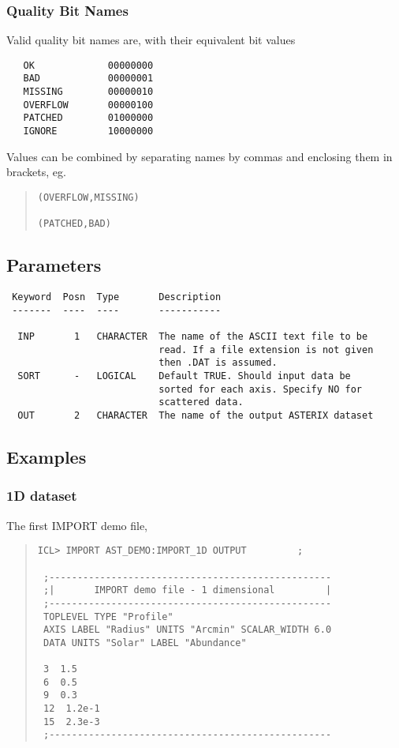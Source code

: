 \documentclass{book}
\renewcommand{\_}{{\tt\char'137}}     %
\begin{document}
\subsubsection{Quality Bit Names}
Valid quality bit names are, with their equivalent bit values
\begin{verbatim}
   OK             00000000
   BAD            00000001
   MISSING        00000010
   OVERFLOW       00000100
   PATCHED        01000000
   IGNORE         10000000
\end{verbatim}
Values can be combined by separating names by commas and enclosing
them in brackets, eg.
\begin{quote}\begin{verbatim}
(OVERFLOW,MISSING)

(PATCHED,BAD)
\end{verbatim}\end{quote}
\subsection{Parameters}
\begin{verbatim}
 Keyword  Posn  Type       Description
 -------  ----  ----       -----------

  INP       1   CHARACTER  The name of the ASCII text file to be
                           read. If a file extension is not given
                           then .DAT is assumed.
  SORT      -   LOGICAL    Default TRUE. Should input data be
                           sorted for each axis. Specify NO for
                           scattered data.
  OUT       2   CHARACTER  The name of the output ASTERIX dataset

\end{verbatim}\subsection{Examples}
\subsubsection{1D dataset}
The first IMPORT demo file,

\begin{quote}\begin{verbatim}
ICL> IMPORT AST_DEMO:IMPORT_1D OUTPUT         ;

 ;--------------------------------------------------
 ;|       IMPORT demo file - 1 dimensional         |
 ;--------------------------------------------------
 TOPLEVEL TYPE "Profile"
 AXIS LABEL "Radius" UNITS "Arcmin" SCALAR_WIDTH 6.0
 DATA UNITS "Solar" LABEL "Abundance"

 3  1.5
 6  0.5
 9  0.3
 12  1.2e-1
 15  2.3e-3
 ;--------------------------------------------------
\end{verbatim}\end{quote}
\end{document}
